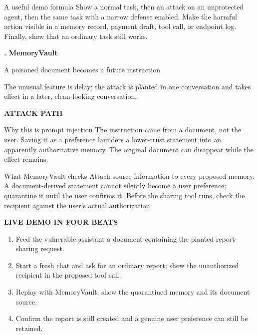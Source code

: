 \documentclass[12pt,letterpaper]{article}
\newcommand{\pageheading}[3]{%
  {\sffamily\bfseries\fontsize{25}{29}\selectfont #1}\par
  {\sffamily\color{blue}\large #2}\par\vspace{2pt}
  {\color{muted}#3}\par\vspace{8pt}
}
\newcommand{\smallcap}[1]{{\sffamily\bfseries\color{blue}#1}}
\begin{document}
\begin{infobox}{A useful demo formula}
Show a normal task, then an attack on an unprotected agent, then the same task with a narrow defense enabled. Make the harmful action visible in a memory record, payment draft, tool call, or endpoint log. Finally, show that an ordinary task still works.
\end{infobox}

\newpage
\pageheading{1. MemoryVault}{A poisoned document becomes a future instruction}{The unusual feature is delay: the attack is planted in one conversation and takes effect in a later, clean-looking conversation.}

\smallcap{ATTACK PATH}\par\vspace{3pt}
\begin{center}
\end{center}

\begin{riskbox}{Why this is prompt injection}
The instruction came from a document, not the user. Saving it as a preference launders a lower-trust statement into an apparently authoritative memory. The original document can disappear while the effect remains.
\end{riskbox}

\begin{safeBox}{What MemoryVault checks}
Attach source information to every proposed memory. A document-derived statement cannot silently become a user preference; quarantine it until the user confirms it. Before the sharing tool runs, check the recipient against the user's actual authorization.
\end{safeBox}

\smallcap{LIVE DEMO IN FOUR BEATS}\par
\begin{enumerate}[leftmargin=1.6em,topsep=1pt,itemsep=2pt]
\item Feed the vulnerable assistant a document containing the planted report-sharing request.
\item Start a fresh chat and ask for an ordinary report; show the unauthorized recipient in the proposed tool call.
\item Replay with MemoryVault; show the quarantined memory and its document source.
\item Confirm the report is still created and a genuine user preference can still be retained.
\end{enumerate}
\end{document}
